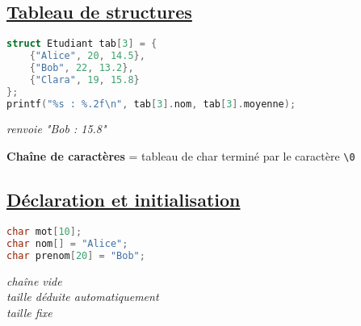 \documentclass[a3paper,12pt]{article}
\begin{document}
\begin{minipage}[t]{0.49\textwidth}
\begin{tcolorbox}[title=Structures, fonttitle=\large, top=5pt, bottom=0pt, boxsep=1pt, colback=white,
  colframe=blue!45!black, 
  colbacktitle=blue!45!black,
  coltitle=white,]
\subsection*{{\small \underline{Tableau de structures}}}
\vspace{-1.25em}
\begin{minipage}[t]{0.5\textwidth} 
\begin{lstlisting}[language=C, showstringspaces=false, basicstyle=\normalsize, aboveskip=0pt, belowskip=0pt]
struct Etudiant tab[3] = {
    {"Alice", 20, 14.5},
    {"Bob", 22, 13.2},
    {"Clara", 19, 15.8}
};
printf("%s : %.2f\n", tab[3].nom, tab[3].moyenne);
\end{lstlisting}
\end{minipage}%
\hspace{6em}
\begin{minipage}[t]{0.45\textwidth}
\vspace{0.15em}
 \textit{renvoie "Bob : 15.8"}
\end{minipage}
  \end{tcolorbox}
  \begin{tcolorbox}[title=Chaînes de caractères, fonttitle=\large, top=5pt, bottom=0pt, boxsep=1pt, colback=white,
  colframe= orange!30!pink, 
  colbacktitle=orange!30!pink,
  coltitle=white,]
  
\textbf{Chaîne de caractères} = tableau de char terminé par le caractère \verb|\0|
\vspace{-1.5em}
\subsection*{{\small \underline{Déclaration et initialisation}}}
\vspace{-1.25em}
\begin{minipage}[t]{0.5\textwidth} 
\begin{lstlisting}[language=C, basicstyle=\normalsize, aboveskip=0pt, belowskip=0pt]
char mot[10];
char nom[] = "Alice";
char prenom[20] = "Bob";
\end{lstlisting}
\end{minipage}%
\hspace{1em}
\begin{minipage}[t]{0.45\textwidth}
\vspace{0.15em}
\textit{chaîne vide}\\
\textit{taille déduite automatiquement}\\
\textit{taille fixe}
\end{minipage}
\vspace{-0.5em}

\end{tcolorbox}
\end{minipage}
\end{document}
